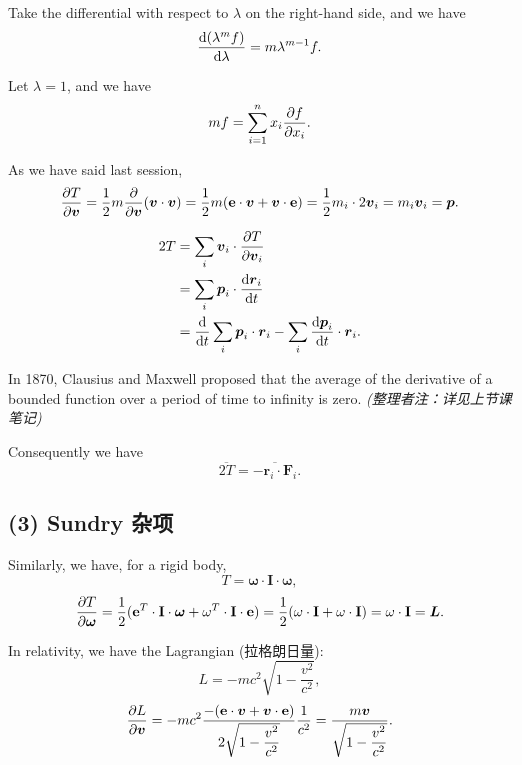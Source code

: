 Take the differential with respect to \(\lambda\) on the right-hand
side, and we have
\[{\mathrm d (\lambda^m f) \over \mathrm d \lambda} = m \lambda^{m - 1} f.\]

Let \(\lambda = 1\), and we have
\[mf = \sum _{i=1}^n x_i {\partial f \over \partial x_i}.\]

As we have said last session,
\[{\partial T \over \partial \boldsymbol v} = {1 \over 2} m {\partial \over \partial \boldsymbol v}(\boldsymbol v \cdot \boldsymbol v) = {1 \over 2} m (\mathbf e \cdot \boldsymbol v + \boldsymbol v \cdot \mathbf e) = {1 \over 2} m_i \cdot 2 \boldsymbol v_i =  m_i \boldsymbol v_i = \boldsymbol p.\]

\begin{align*}
    2T & = \sum_i \boldsymbol v_i \cdot {\partial T \over \partial \boldsymbol v_i} \\
    & = \sum_i \boldsymbol p_i \cdot {\mathrm d \boldsymbol r_i \over \mathrm dt} \\
    & = {\mathrm d \over \mathrm dt} \sum_i \boldsymbol p_i \cdot \boldsymbol r_i - \sum_i {\mathrm d \boldsymbol p_i \over \mathrm dt} \cdot \boldsymbol r_i. \\
\end{align*}

In 1870, Clausius and Maxwell proposed that the average of the
derivative of a bounded function over a period of time to infinity is
zero. \emph{(整理者注：详见上节课笔记)}

Consequently we have
\[\overline{2T} = \overline{- \boldsymbol r_i \cdot \boldsymbol F_i}.\]

\subsection*{(3) Sundry 杂项}\label{sundry-ux6742ux9879}

Similarly, we have, for a rigid body,
\[T = \boldsymbol \omega \cdot \mathbf{I} \cdot \boldsymbol \omega,\]
\[\dfrac{\partial T}{\partial \boldsymbol \omega} = {1 \over 2} (\mathbf{e}^T \cdot \mathbf{I} \cdot \boldsymbol{\omega} + \omega^T \cdot \mathbf{I} \cdot \mathbf{e}) = {1 \over 2} (\omega \cdot \mathbf{I} + \omega \cdot \mathbf{I}) = \omega \cdot \mathbf{I}  = \boldsymbol{L}.\]

In relativity, we have the Lagrangian (拉格朗日量):
\[L = - m c^2 \sqrt{1 - \dfrac{v^2}{c^2}},\]
\[\dfrac{\partial L}{\partial \boldsymbol v} = - mc^2 \dfrac{- (\mathbf e \cdot \boldsymbol v + \boldsymbol v \cdot \mathbf e)}{2 \sqrt{1 - \dfrac{v^2}{c^2}}} {1 \over c^2} = \dfrac{m \boldsymbol{v}}{\sqrt{1 - \dfrac{v^2}{c^2}}}.\]

